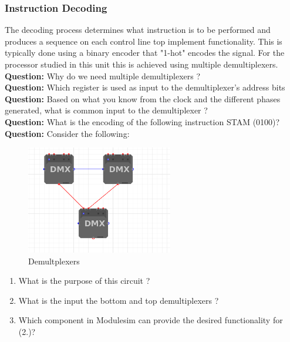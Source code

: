 \documentclass[a4paper, 11pt]{article}
\begin{document}
\subsubsection{Instruction Decoding}
The decoding process determines what instruction is to be performed and produces a sequence on each control line top implement functionality. This is typically done using a binary encoder that "1-hot" encodes the signal. For the processor studied in this unit this is achieved using multiple demultiplexers. \\
\textbf{Question:} Why do we need multiple demultiplexers ? \\
\textbf{Question:} Which register is used as input to the demultiplexer's address bits\\
\textbf{Question:} Based on what you know from the clock and the different phases generated, what is common input to the demultiplexer ? \\
\textbf{Question:} What is the encoding of the following instruction STAM (0100)?\\
\textbf{Question:} Consider the following:
\begin{figure}[H]
    \centering
    \includegraphics[width =0.57\textwidth]{Images/Screenshot from 2022-12-14 16-31-07.png}
    \caption{Demultplexers}
    \label{fig:demux}
    \end{figure}
\begin{enumerate}
    \item What is the purpose of this circuit ?
    \item What is the input the bottom and top demultiplexers ?
    \item Which component in Modulesim can provide the desired functionality for (2.)?
\end{enumerate}
\end{document}
